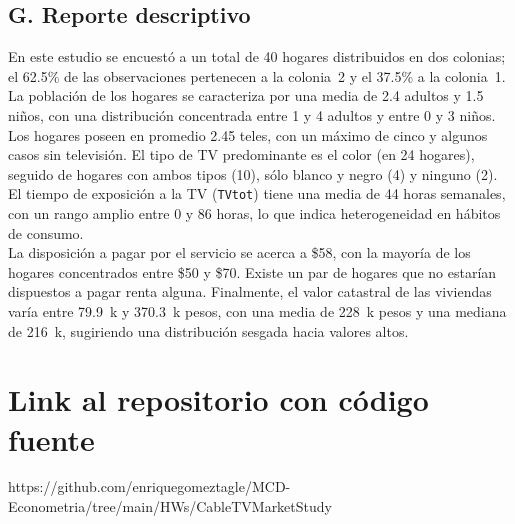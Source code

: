 \documentclass[10pt]{article}
\begin{document}
\subsection*{G. Reporte descriptivo}
En este estudio se encuestó a un total de 40 hogares distribuidos en dos colonias; el 62.5\% de las observaciones pertenecen a la colonia~2 y el 37.5\% a la colonia~1. La población de los hogares se caracteriza por una media de 2.4 adultos y 1.5 niños, con una distribución concentrada entre 1 y 4 adultos y entre 0 y 3 niños.\\
Los hogares poseen en promedio 2.45 teles, con un máximo de cinco y algunos casos sin televisión. El tipo de TV predominante es el color (en 24 hogares), seguido de hogares con ambos tipos (10), sólo blanco y negro (4) y ninguno (2). El tiempo de exposición a la TV (\texttt{TVtot}) tiene una media de 44 horas semanales, con un rango amplio entre 0 y 86 horas, lo que indica heterogeneidad en hábitos de consumo.\\
La disposición a pagar por el servicio se acerca a \$58, con la mayoría de los hogares concentrados entre \$50 y \$70. Existe un par de hogares que no estarían dispuestos a pagar renta alguna. Finalmente, el valor catastral de las viviendas varía entre 79.9~k y 370.3~k pesos, con una media de 228~k pesos y una mediana de 216~k, sugiriendo una distribución sesgada hacia valores altos.

\section{Link al repositorio con código fuente}
https://github.com/enriquegomeztagle/MCD-Econometria/tree/main/HWs/CableTVMarketStudy
\end{document}
